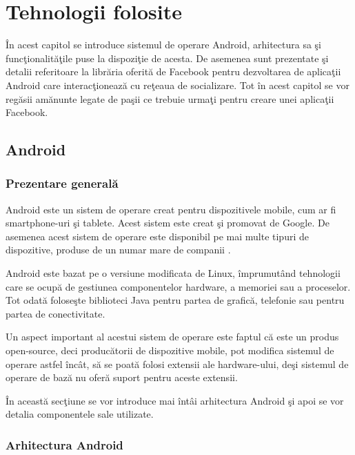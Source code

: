 \chapter{Tehnologii folosite}

\^{I}n acest capitol se introduce sistemul de operare Android, arhitectura sa \c{s}i func\c{t}ionalit\u{a}\c{t}ile puse la dispozi\c{t}ie de acesta. De asemenea sunt prezentate \c{s}i detalii referitoare la libr\u{a}ria oferit\u{a} de Facebook pentru dezvoltarea de aplica\c{t}ii Android care interac\c{t}ioneaz\u{a} cu re\c{t}eaua de socializare. Tot \^{i}n acest capitol  se vor reg\u{a}sii am\u{a}nunte legate de pa\c{s}ii ce trebuie urma\c{t}i pentru creare unei aplica\c{t}ii  Facebook.

\section{Android}

\subsection{Prezentare general\u{a}}
Android este un sistem de operare creat pentru dispozitivele mobile, cum ar fi smartphone-uri \c{s}i tablete. Acest sistem este creat \c{s}i promovat de Google. De asemenea acest sistem de operare este disponibil pe mai multe tipuri de dispozitive, produse de un numar mare de companii \cite{marketShare}.

	Android este bazat pe o versiune modificata de Linux, \^{i}mprumut\^{a}nd tehnologii care se ocup\u{a} de gestiunea componentelor hardware, a memoriei sau a proceselor. Tot odat\u{a} folose\c{s}te biblioteci Java pentru partea de grafic\u{a}, telefonie sau pentru partea de conectivitate.

	Un aspect important al acestui sistem de operare este faptul c\u{a} este un produs open-source, deci produc\u{a}torii de dispozitive mobile, pot modifica sistemul de operare astfel \^{i}nc\^{a}t, s\u{a} se poat\u{a} folosi extensii ale hardware-ului, de\c{s}i sistemul de operare de baz\u{a} nu ofer\u{a} suport pentru aceste extensii.

\^{I}n aceast\u{a} sec\c{t}iune se vor introduce mai \^{i}nt\^{a}i arhitectura Android \c{s}i apoi se vor detalia componentele sale utilizate.
\subsection{Arhitectura Android}

